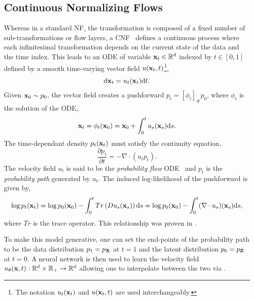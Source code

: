 \subsection{Continuous Normalizing Flows}

Whereas in a standard NF, the transformation is composed of a fixed number of sub-transformations or flow layers, a \Gls{CNF}~\cite{NeuralODE} defines a continuous process where each infinitesimal transformation depends on the current state of the data and the time index.
This leads to an \Gls{ODE} of variable $\mathbf{x}_t \in \mathbb{R}^d$ indexed by $t \in [0, 1]$ defined by a smooth time-varying vector field $u(\mathbf{x}_t, t)$\footnote{The notation $u_t(\mathbf{x}_t)$ and $u(\mathbf{x}_t, t)$ are used interchangeably.},
\begin{equation}
    \label{eq:cnf}
    \mathrm{d} \mathbf{x}_t = u_t(\mathbf{x}_t) \mathrm{d} t.
\end{equation}
Given $\mathbf{x}_0 \sim p_0$, the vector field creates a pushforward $p_t = [\phi_t]_\# p_0$, where $\phi_t$ is the solution of the \Gls{ODE},
\begin{equation}
    \label{eq:cnf_pushforward}
    \mathbf{x}_t = \phi_t(\mathbf{x}_0) = \mathbf{x}_0 + \int_0^t u_s(\mathbf{x}_s) \mathrm{d} s.
\end{equation}
The time-dependant density $p_t(\mathbf{x}_t)$ must satisfy the continuity equation,
\begin{equation}
    \label{eq:cnf_continuity}
    \frac{\partial p_t}{\partial t} = -\nabla \cdot (u_t p_t).
\end{equation}
The velocity field $u_t$ is said to be the \textit{probability flow} \Gls{ODE}~\cite{ScoreBasedGenerativeModeling} and $p_t$ is the \textit{probability path} generated by $u_t$.
The induced log-likelihood of the pushforward is given by,
\begin{equation}
    \label{eq:cnf_loglikelihood}
    \log p_t(\mathbf{x}_t)
    = \log p_0(\mathbf{x}_0) - \int_0^t Tr\left(D u_s(\mathbf{x}_s)\right)\mathrm{d} s
    = \log p_0(\mathbf{x}_0) - \int_0^t (\nabla \cdot u_s)(\mathbf{x}_s) \mathrm{d} s,
\end{equation}
where $Tr$ is the trace operator.
This relationship was proven in \textcite{NeuralODE}.

To make this model generative, one can set the end-points of the probability path to be the data distribution $p_1 = p_{\mathbf{X}}$ at $t=1$ and the latent distribution $p_0 = p_{\mathbf{Z}}$ at $t=0$.
A neural network is then used to learn the velocity field $u_\theta(\mathbf{x}, t): \mathbb{R}^d \times \mathbb{R}_{+} \rightarrow \mathbb{R}^d$ allowing one to interpolate between the two via .

